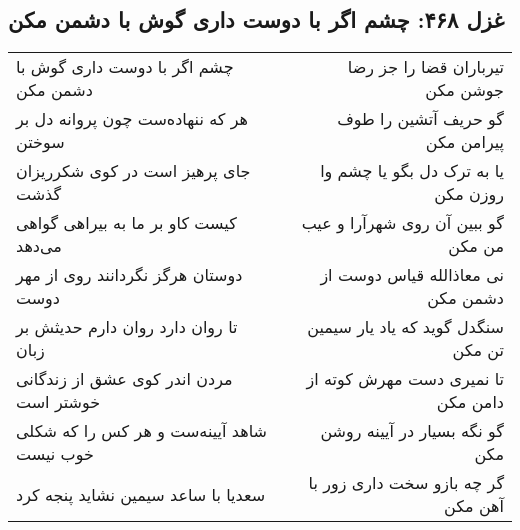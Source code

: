 \begin{center}
\section*{غزل ۴۶۸: چشم اگر با دوست داری گوش با دشمن مکن}
\label{sec:468}
\begin{longtable}{l p{0.5cm} r}
چشم اگر با دوست داری گوش با دشمن مکن
&&
تیرباران قضا را جز رضا جوشن مکن
\\
هر که ننهاده‌ست چون پروانه دل بر سوختن
&&
گو حریف آتشین را طوف پیرامن مکن
\\
جای پرهیز است در کوی شکرریزان گذشت
&&
یا به ترک دل بگو یا چشم وا روزن مکن
\\
کیست کاو بر ما به بیراهی گواهی می‌دهد
&&
گو ببین آن روی شهرآرا و عیب من مکن
\\
دوستان هرگز نگردانند روی از مهر دوست
&&
نی معاذالله قیاس دوست از دشمن مکن
\\
تا روان دارد روان دارم حدیثش بر زبان
&&
سنگدل گوید که یاد یار سیمین تن مکن
\\
مردن اندر کوی عشق از زندگانی خوشتر است
&&
تا نمیری دست مهرش کوته از دامن مکن
\\
شاهد آیینه‌ست و هر کس را که شکلی خوب نیست
&&
گو نگه بسیار در آیینه روشن مکن
\\
سعدیا با ساعد سیمین نشاید پنجه کرد
&&
گر چه بازو سخت داری زور با آهن مکن
\\
\end{longtable}
\end{center}
